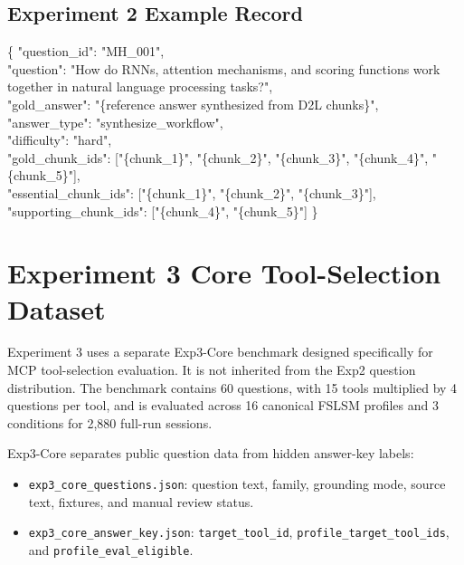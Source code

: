\subsection{Experiment 2 Example Record}
\begin{shadedquotation}
\{
    "question\_id": "MH\_001", \\
    "question": "How do RNNs, attention mechanisms, and scoring functions work together in natural language processing tasks?", \\
    "gold\_answer": "\{reference answer synthesized from D2L chunks\}", \\
    "answer\_type": "synthesize\_workflow", \\
    "difficulty": "hard", \\
    "gold\_chunk\_ids": ["\{chunk\_1\}", "\{chunk\_2\}", "\{chunk\_3\}", "\{chunk\_4\}", "\{chunk\_5\}"], \\
    "essential\_chunk\_ids": ["\{chunk\_1\}", "\{chunk\_2\}", "\{chunk\_3\}"], \\
    "supporting\_chunk\_ids": ["\{chunk\_4\}", "\{chunk\_5\}"]
\}
\end{shadedquotation}

\section{Experiment 3 Core Tool-Selection Dataset}
Experiment 3 uses a separate Exp3-Core benchmark designed specifically for MCP tool-selection evaluation. It is not inherited from the Exp2 question distribution. The benchmark contains 60 questions, with 15 tools multiplied by 4 questions per tool, and is evaluated across 16 canonical FSLSM profiles and 3 conditions for 2,880 full-run sessions.

Exp3-Core separates public question data from hidden answer-key labels:
\begin{itemize}
    \item \texttt{exp3\_core\_questions.json}: question text, family, grounding mode, source text, fixtures, and manual review status.
    \item \texttt{exp3\_core\_answer\_key.json}: \texttt{target\_tool\_id}, \texttt{profile\_target\_tool\_ids}, and \texttt{profile\_eval\_eligible}.
\end{itemize}

